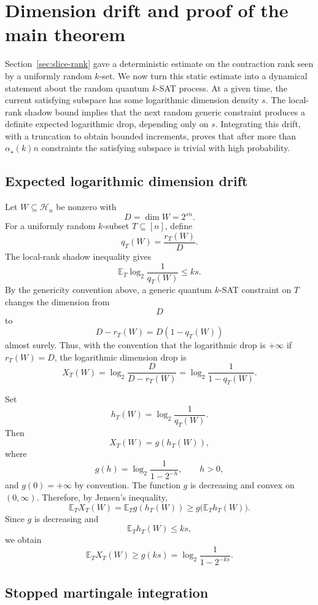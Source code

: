 \documentclass[11pt]{article}
\begin{document}
	
\section{Dimension drift and proof of the main theorem}\label{sec:dimension-drift-proof}

Section~\ref{sec:slice-rank} gave a deterministic estimate on the contraction
rank seen by a uniformly random \(k\)-set.  We now turn this static estimate
into a dynamical statement about the random quantum \(k\)-SAT process.  At a
given time, the current satisfying subspace has some logarithmic dimension
density \(s\).  The local-rank shadow bound implies that the next random
generic constraint produces a definite expected logarithmic drop, depending
only on \(s\).  Integrating this drift, with a truncation to obtain bounded
increments, proves that after more than \(\alpha_\star(k)n\) constraints the
satisfying subspace is trivial with high probability.

\subsection{Expected logarithmic dimension drift}\label{sec:drift}
	
	Let \(W\subseteq\mathcal H_n\) be nonzero with
	\[
	D=\dim W=2^{sn}.
	\]
	For a uniformly random \(k\)-subset \(T\subseteq[n]\), define
	\[
	q_T(W)=\frac{r_T(W)}{D}.
	\]
	The local-rank shadow inequality gives
	\[
	\mathbb E_T\log_2\frac1{q_T(W)}
	\le
	ks.
	\]
	By the genericity convention above, a generic quantum \(k\)-SAT
	constraint on \(T\) changes the dimension from
	\[
	D
	\]
	to
	\[
	D-r_T(W)=D(1-q_T(W))
	\]
	almost surely. Thus, with the convention that the logarithmic drop is
	\(+\infty\) if \(r_T(W)=D\), the logarithmic dimension drop is
	\[
	X_T(W)
	=
	\log_2\frac{D}{D-r_T(W)}
	=
	\log_2\frac1{1-q_T(W)}.
	\]
	
	Set
	\[
	h_T(W)=\log_2\frac1{q_T(W)}.
	\]
	Then
	\[
	X_T(W)=g(h_T(W)),
	\]
	where
	\[
	g(h)=\log_2\frac1{1-2^{-h}},\qquad h>0,
	\]
	and \(g(0)=+\infty\) by convention. The function \(g\) is decreasing and
	convex on \((0,\infty)\). Therefore,
	by Jensen's inequality,
	\[
	\mathbb E_T X_T(W)
	=
	\mathbb E_T g(h_T(W))
	\ge
	g\bigl(\mathbb E_T h_T(W)\bigr).
	\]
	Since \(g\) is decreasing and
	\[
	\mathbb E_T h_T(W)\le ks,
	\]
	we obtain
	\[
	\mathbb E_T X_T(W)
	\ge
	g(ks)
	=
	\log_2\frac1{1-2^{-ks}}.
	\]
	
\subsection{Stopped martingale integration}\label{sec:martingale}
	
\end{document}
